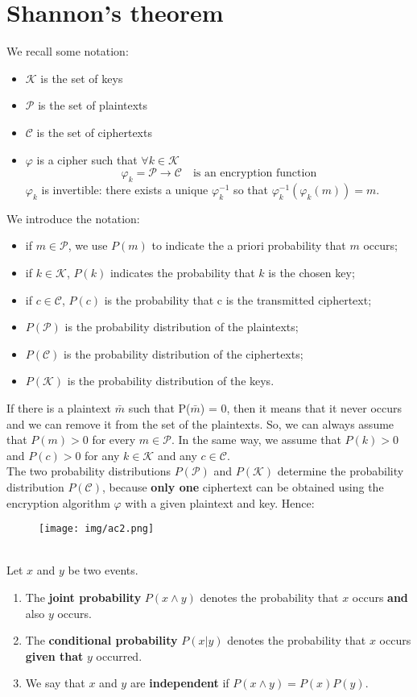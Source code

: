 \documentclass[a4paper, 10pt, titlepage]{article}
\begin{document}
\section{Shannon’s theorem}
We recall some notation:
\begin{itemize}
\item $\mathcal{K}$ is the set of keys
\item $\mathcal{P}$ is the set of plaintexts
\item $\mathcal{C}$ is the set of ciphertexts
\item $\varphi$ is a cipher such that $\forall k \in \mathcal{K}$
$$\varphi_k = \mathcal{P} \rightarrow \mathcal{C} \quad \text{is an encryption function}$$
$\varphi_k$ is invertible: there exists a unique $\varphi_k^{-1}$ so that $\varphi_k^{-1}(\varphi_k(m)) = m$.
\end{itemize}
We introduce the notation:
\begin{itemize}
\item if $m \in \mathcal{P}$, we use $P(m)$ to indicate the a priori probability that $m$ occurs;
\item if $k \in \mathcal{K}$, $P(k)$ indicates the probability that $k$ is the chosen key;
\item if $c \in \mathcal{C}$, $P(c)$ is the probability that c is the transmitted ciphertext;
\item $P(\mathcal{P})$ is the probability distribution of the plaintexts;
\item $P(\mathcal{C})$ is the probability distribution of the ciphertexts;
\item $P(\mathcal{K})$ is the probability distribution of the keys.
\end{itemize}
If there is a plaintext $\bar{m}$ such that P($\bar{m}$) = 0, then it means that it never occurs and we can remove it from the set of the plaintexts. So, we can always assume that $P(m) > 0$ for every $m \in \mathcal{P}$.
In the same way, we assume that $P(k) > 0$ and $P(c) > 0$ for any $k \in \mathcal{K}$ and any $c \in \mathcal{C}$.\\
The two probability distributions $P(\mathcal{P})$ and $P(\mathcal{K})$ determine the probability distribution $P(\mathcal{C})$, because \textbf{only one} ciphertext can be obtained using the encryption algorithm $\varphi$ with a given plaintext and key. Hence:
\begin{figure}[h]
\centering
\texttt{[image: img/ac2.png]}
\end{figure}\\
Let $x$ and $y$ be two events.
\begin{enumerate}
\item The \textbf{joint probability} $P(x \wedge y )$ denotes the probability that $x$ occurs \textbf{and} also $y$ occurs.
\item The \textbf{conditional probability} $P(x | y )$ denotes the probability that $x$ occurs \textbf{given that} $y$ occurred.
\item We say that $x$ and $y$ are \textbf{independent} if $P(x \wedge y ) = P(x)P(y )$.
\end{enumerate}
\end{document}
